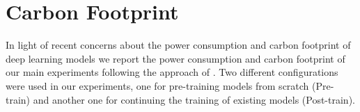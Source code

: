 \section{Carbon Footprint}\label{carbon-footprint}

\begin{table}[t]
    \centering\small
    \caption{Average power draw, number of models trained, training times in hours, mean power consumption including power usage effectiveness (PUE), and CO\textsubscript{2} emissions; for each setting.}
    \label{tab:carbon-bertrade}
\end{table}

In light of recent concerns about the power consumption and carbon footprint of deep learning models \citep{schwartz-etal-2020-green, bender-etal-2021-on} we report the power consumption and carbon footprint of our main experiments following the approach of \citet{strubell-etal-2019-energy}. Two different configurations were used in our experiments, one for pre-training models from scratch (Pre-train) and another one for continuing the training of existing models (Post-train).

